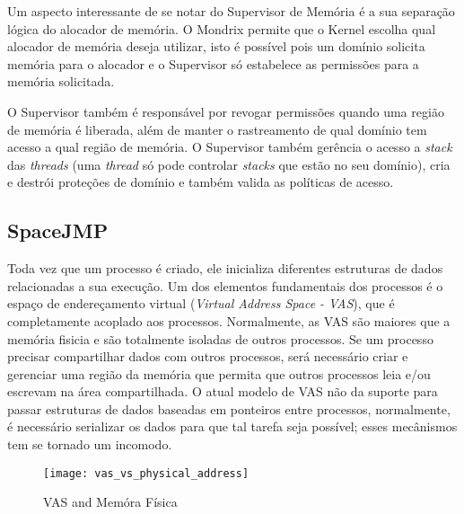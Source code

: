 Um aspecto interessante de se notar do Supervisor de Memória é a sua separação
lógica do alocador de memória. O Mondrix permite que o Kernel escolha qual
alocador de memória deseja utilizar, isto é possível pois um domínio solicita
memória para o alocador e o Supervisor só estabelece as permissões para a
memória solicitada.

O Supervisor também é responsável por revogar permissões quando uma região de
memória é liberada, além de manter o rastreamento de qual domínio tem acesso a
qual região de memória. O Supervisor também gerência o acesso a \emph{stack}
das \emph{threads} (uma \emph{thread} só pode controlar \emph{stacks} que estão
no seu domínio), cria e destrói proteções de domínio e também valida as
políticas de acesso.

\subsection{SpaceJMP}
\label{sec:mvas}

Toda vez que um processo é criado, ele inicializa diferentes estruturas de
dados relacionadas a sua execução. Um dos elementos fundamentais dos processos
é o espaço de endereçamento virtual (\emph{Virtual Address Space - VAS}), que é
completamente acoplado aos processos. Normalmente, as VAS são maiores que a
memória fisicia e são totalmente isoladas de outros processos. Se um processo
precisar compartilhar dados com outros processos, será necessário criar e
gerenciar uma região da memória que permita que outros processos leia e/ou
escrevam na área compartilhada. O atual modelo de VAS não da suporte para
passar estruturas de dados baseadas em ponteiros entre processos, normalmente,
é necessário serializar os dados para que tal tarefa seja possível; esses
mecânismos tem se tornado um incomodo.

\begin{figure}[!h]
  \centering
  \texttt{[image: vas\_vs\_physical\_address]} 
  \caption{VAS and Memóra Física}
  \label{fig:vas_vs_physical} 
\end{figure}

